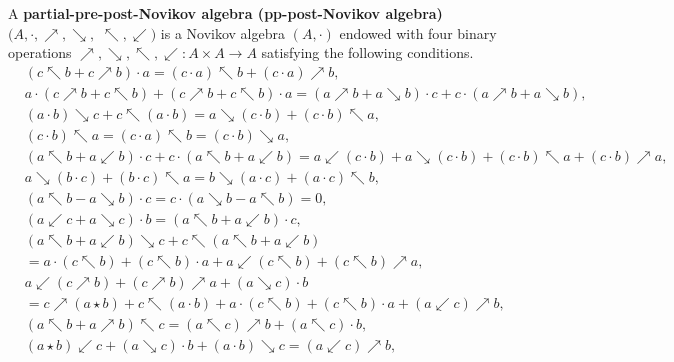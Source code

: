 \documentclass[12pt]{amsart}
\begin{document}
\begin{definition}
A   {\bf partial-pre-post-Novikov algebra (pp-post-Novikov algebra)} $(A,\cdot,\nearrow,\searrow,$ $\nwarrow,\swarrow)$ is a Novikov algebra $(A,\cdot)$ endowed with four
 binary operations $\nearrow,\searrow,\nwarrow,\swarrow:A\times A\rightarrow A$ satisfying the following
 conditions.
{\small
\begin{align}
    \label{pppn1}&(c\nwarrow b+ c\nearrow b)\cdot a=(c\cdot a )\nwarrow b+(c\cdot a)\nearrow b,\\
    \label{pppn2}&a\cdot (c\nearrow b+c\nwarrow b)+(c\nearrow b+ c\nwarrow b)\cdot a=(a\nearrow b+a\searrow b)\cdot c+c\cdot (a\nearrow b+a\searrow b),\\
    \label{pppn3}&(a \cdot b) \searrow c + c \nwarrow (a \cdot b) = a \searrow (c \cdot b) + (c \cdot b) \nwarrow a,\\
        \label{pppn4}&(c \cdot b) \nwarrow a = (c \cdot a) \nwarrow b= (c\cdot b)\searrow a,\\
           \label{pppn5}&(a\nwarrow b + a\swarrow b) \cdot c + c \cdot (a\nwarrow b + a\swarrow b)
        = a \swarrow (c \cdot b) + a \searrow (c \cdot b) + (c \cdot b)\nwarrow a+ (c\cdot b)\nearrow a , \\
             \label{pppn6}   &a \searrow (b \cdot c) + (b \cdot c) \nwarrow a = b \searrow (a \cdot c) + (a \cdot c) \nwarrow b,\\
              \label{pppn7}& (a \nwarrow b- a\searrow b ) \cdot c =  c\cdot ( a\searrow b- a\nwarrow b)=0,\\
             \label{pppn8}&(a\swarrow c + a\searrow c) \cdot b = (a\nwarrow b + a\swarrow b) \cdot c,                \\
             \label{pppn9}   & (a\nwarrow b+a\swarrow b )\searrow c+c\nwarrow(a\nwarrow b+a\swarrow b)\\
             &= a\cdot(c\nwarrow b)+(c\nwarrow b)\cdot a+a\swarrow(c\nwarrow b)+(c\nwarrow b)\nearrow a,\nonumber\\
              \label{pppn10}& a\swarrow(c\nearrow b )+(c\nearrow b)\nearrow a+(a\searrow c)\cdot b\\
             &= c\nearrow(a\star b)+c\nwarrow(a\cdot b)+a\cdot (c\nwarrow b)+(c\nwarrow b)\cdot a+(a\swarrow c)\nearrow b,  \nonumber \\
             \label{pppn11}  &(a\nwarrow b+a\nearrow b)\nwarrow c=(a\nwarrow c)\nearrow b+(a\nwarrow c)\cdot b,\\
              \label{pppn12}&(a\star b)\swarrow c+(a\searrow c)\cdot b+(a\cdot b)\searrow c=(a\swarrow c)\nearrow b,

\end{align}}
\end{definition}
\end{document}
